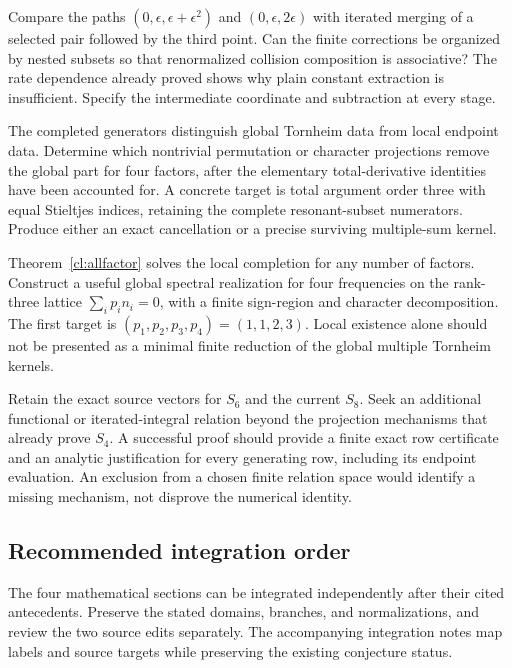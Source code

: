 \begin{question}
Compare the paths $(0,\epsilon,\epsilon+\epsilon^2)$ and
$(0,\epsilon,2\epsilon)$ with iterated merging of a selected
pair followed by the third point. Can the finite corrections
be organized by nested subsets so that renormalized collision
composition is associative? The rate dependence already proved
shows why plain constant extraction is insufficient. Specify
the intermediate coordinate and subtraction at every stage.
\end{question}

\begin{question}
The completed generators distinguish global Tornheim data from
local endpoint data. Determine which nontrivial permutation
or character projections remove the global part for four
factors, after the elementary total-derivative identities have
been accounted for. A concrete target is total argument order
three with equal Stieltjes indices, retaining the complete
resonant-subset numerators. Produce either an exact cancellation
or a precise surviving multiple-sum kernel.
\end{question}

\begin{question}
Theorem~\ref{cl:allfactor} solves the local completion for any
number of factors. Construct a useful global spectral realization
for four frequencies on the rank-three lattice
$\sum_i p_i n_i=0$, with a finite sign-region and character
decomposition. The first target is $(p_1,p_2,p_3,p_4)=(1,1,2,3)$.
Local existence alone should not be presented as a minimal
finite reduction of the global multiple Tornheim kernels.
\end{question}

\begin{question}
Retain the exact source vectors for $S_6$ and the current $S_8$.
Seek an additional functional or iterated-integral relation
beyond the projection mechanisms that already prove $S_4$.
A successful proof should provide a finite exact row certificate
and an analytic justification for every generating row,
including its endpoint evaluation. An exclusion from a chosen
finite relation space would identify a missing mechanism,
not disprove the numerical identity.
\end{question}

\subsection{Recommended integration order}

The four mathematical sections can be integrated independently after
their cited antecedents. Preserve the stated domains, branches, and
normalizations, and review the two source edits separately.
The accompanying integration notes map labels and source targets
while preserving the existing conjecture status.

